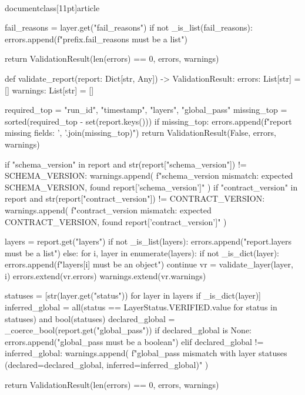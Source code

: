 \\documentclass[11pt]{article}
\begin{document}
\begin{CodeBlock}
    fail_reasons = layer.get("fail_reasons")
    if not _is_list(fail_reasons):
        errors.append(f"{prefix}.fail_reasons must be a list")

    return ValidationResult(len(errors) == 0, errors, warnings)


def validate_report(report: Dict[str, Any]) -> ValidationResult:
    errors: List[str] = []
    warnings: List[str] = []

    required_top = {"run_id", "timestamp", "layers", "global_pass"}
    missing_top = sorted(required_top - set(report.keys()))
    if missing_top:
        errors.append(f"report missing fields: {', '.join(missing_top)}")
        return ValidationResult(False, errors, warnings)

    if "schema_version" in report and str(report["schema_version"]) != SCHEMA_VERSION:
        warnings.append(
            f"schema_version mismatch: expected {SCHEMA_VERSION}, found {report['schema_version']}"
        )
    if "contract_version" in report and str(report["contract_version"]) != CONTRACT_VERSION:
        warnings.append(
            f"contract_version mismatch: expected {CONTRACT_VERSION}, found {report['contract_version']}"
        )

    layers = report.get("layers")
    if not _is_list(layers):
        errors.append("report.layers must be a list")
    else:
        for i, layer in enumerate(layers):
            if not _is_dict(layer):
                errors.append(f"layers[{i}] must be an object")
                continue
            vr = validate_layer(layer, i)
            errors.extend(vr.errors)
            warnings.extend(vr.warnings)

        statuses = [str(layer.get("status")) for layer in layers if _is_dict(layer)]
        inferred_global = all(status == LayerStatus.VERIFIED.value for status in statuses) and bool(statuses)
        declared_global = _coerce_bool(report.get("global_pass"))
        if declared_global is None:
            errors.append("global_pass must be a boolean")
        elif declared_global != inferred_global:
            warnings.append(
                f"global_pass mismatch with layer statuses (declared={declared_global}, inferred={inferred_global})"
            )

    return ValidationResult(len(errors) == 0, errors, warnings)



\end{CodeBlock}
\end{document}

